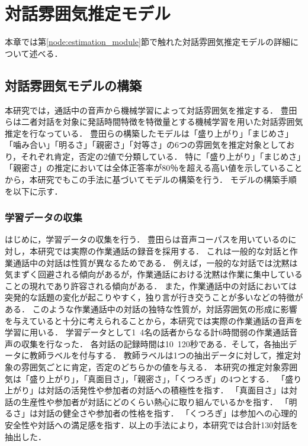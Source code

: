 \chapter{対話雰囲気推定モデル\label{sec:estimation_model}}
\thispagestyle{plain}

本章では第\ref{node:estimation_module}節で触れた対話雰囲気推定モデルの詳細について述べる．

\section{対話雰囲気モデルの構築\label{node:develop_estimation_model}}

本研究では，通話中の音声から機械学習によって対話雰囲気を推定する．
豊田らは二者対話を対象に発話時間特徴を特徴量とする機械学習を用いた対話雰囲気推定を行なっている．
豊田らの構築したモデルは「盛り上がり」「まじめさ」「噛み合い」「明るさ」「親密さ」「対等さ」の6つの雰囲気を推定対象としており，それぞれ肯定，否定の2値で分類している．
特に「盛り上がり」「まじめさ」「親密さ」の推定においては全体正答率が80％を超える高い値を示していることから，本研究でもこの手法に基づいてモデルの構築を行う．
モデルの構築手順を以下に示す．

\subsection{学習データの収集}

はじめに，学習データの収集を行う．
豊田らは音声コーパス\cite{PASD}を用いているのに対し，本研究では実際の作業通話の録音を採用する．
これは一般的な対話と作業通話中の対話は性質が異なるためである．
例えば，一般的な対話では沈黙は気まずく回避される傾向があるが，作業通話における沈黙は作業に集中していることの現れであり許容される傾向がある．
また，作業通話中の対話においては突発的な話題の変化が起こりやすく，独り言が行き交うことが多いなどの特徴がある．
このような作業通話中の対話の独特な性質が，対話雰囲気の形成に影響を与えていると十分に考えられることから，本研究では実際の作業通話の音声を学習に用いる．
学習データとして1~4名の話者からなる計6時間弱の作業通話音声の収集を行なった．
各対話の記録時間は10~120秒である．そして，各抽出データに教師ラベルを付与する．
教師ラベルは1つの抽出データに対して，推定対象の雰囲気ごとに肯定，否定のどちらかの値を与える．
本研究の推定対象雰囲気は「盛り上がり」，「真面目さ」，「親密さ」，「くつろぎ」の4つとする．
「盛り上がり」は対話の活発性や参加者の対話への積極性を指す．
「真面目さ」は対話の生産性や参加者が対話にどのくらい熱心に取り組んでいるかを指す．
「明るさ」は対話の健全さや参加者の性格を指す．
「くつろぎ」は参加への心理的安全性や対話への満足感を指す．以上の手法により，本研究では合計130対話を抽出した．

